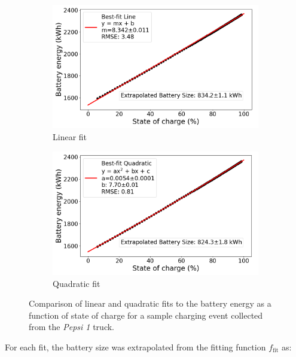 \begin{figure}[ht]
    \centering
    \begin{subfigure}[b]{0.48\textwidth}
        \centering
        \includegraphics[width=\textwidth]{figures/pepsi_1_battery_soc_vs_energy_event_11_linearfit.png}
        \caption{Linear fit}
        \label{fig:charging_linear_fit}
    \end{subfigure}
    \hfill
    \begin{subfigure}[b]{0.48\textwidth}
        \centering
        \includegraphics[width=\textwidth]{figures/pepsi_1_battery_soc_vs_energy_event_11_quadfit.png}
        \caption{Quadratic fit}
        \label{fig:charging_quad_fit}
    \end{subfigure}
    \caption{Comparison of linear and quadratic fits to the battery energy as a function of state of charge for a sample charging event collected from the \textit{Pepsi 1} truck.}
    \label{fig:charging_fits}
\end{figure}

For each fit, the battery size was extrapolated from the fitting function $f_\text{fit}$ as:

